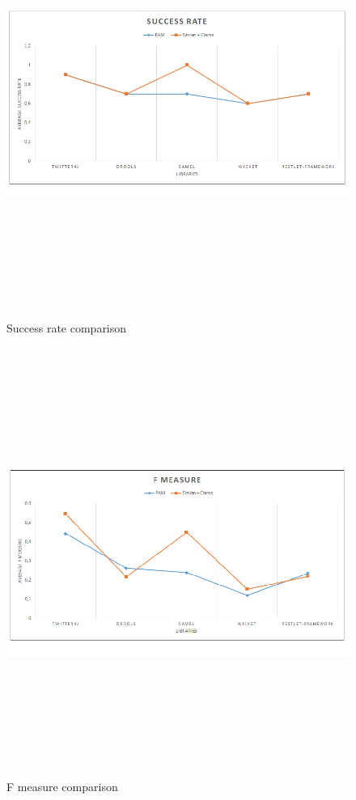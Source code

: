 \begin{figure}[!h]
\includegraphics[width=14cm,height=14cm,keepaspectratio]{images/SuccRate.png}
\centering
\caption{Success rate comparison}
\label{fig:cmd}
\end{figure}


\begin{figure}[!h]
\includegraphics[width=14cm,height=14cm,keepaspectratio]{images/Fmeasure.png}
\centering
\caption{F measure  comparison}
\label{fig:cmd}
\end{figure}


